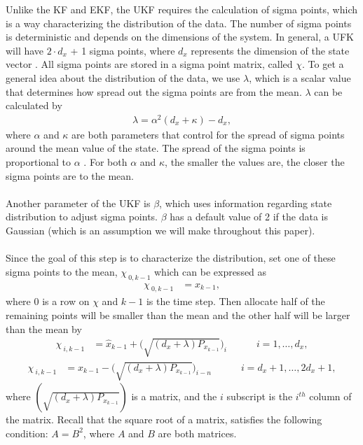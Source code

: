 \begin{enumerate}
\noindent Unlike the KF and EKF, the UKF requires the calculation of sigma points, which is a way characterizing the distribution of the data. The number of sigma points is deterministic and depends on the dimensions of the system. In general, a UFK will have  $2 \cdot d_x$ + 1 sigma points, where $d_x$ represents the dimension of the state vector \cite{inbook, inproceedings, Wan01theunscented}.  All sigma points are stored in a sigma point matrix, called $\chi$. To get a general idea about the distribution of the data, we use $\lambda$, which is a scalar value that determines how spread out the sigma points are from the mean. $\lambda$ can be calculated by
         \begin{align*}
        \lambda = \alpha^{2}(d_{x}+\kappa)-d_{x},
         \end{align*}
         where  $\alpha$ and $\kappa$ are both parameters that control for the spread of sigma points around the mean value of the state. The spread of the sigma points is proportional to $\alpha$ . For both $\alpha$ and $\kappa $,  the smaller the values are, the closer the sigma points are to the mean.\\ \\
       Another parameter of the UKF is $\beta$, which uses information regarding state distribution to adjust sigma points. $\beta$ has a default value of 2 if the data is Gaussian (which is an assumption we will make throughout this paper).  \\ \\
       Since the goal of this step is to characterize the distribution, set one of these sigma points to the mean, $\chi_{\ 0,k-1}$ which can be expressed as 
    \begin{align*}
        \chi_{\ 0,k-1} &= x_{k-1} ,
     \end{align*}
     where 0 is a row on $\chi$ and $k-1$ is the time step. Then allocate half of the remaining points will be smaller than the mean and the other half will be larger than the mean by
         \begin{align*}
        \chi_{\ i,k-1} &= \hat{x}_{k-1} +  \bigg(\sqrt{(d_{x}+\lambda )P_{x_{k-1}}}\bigg)_{i} \quad \quad \quad i=1,\dots, d_x, 
        \end{align*}
         \begin{align*}
        \chi_{\ i,k-1} &= \hat{x}_{k-1} - \bigg(\sqrt{(d_{x}+\lambda )P_{x_{k-1}}}\bigg)_{i-n} \quad \quad \quad i=d_x + 1,\dots,2 d_x + 1,
        \end{align*}
        where $(\sqrt{(d_{x}+\lambda)P_{x_{k-1}}})$ is a matrix, and the $i$ subscript is the $i^{th}$ column of the matrix. 
        Recall that the square root of a matrix, satisfies the following condition: $A = B^2$, where $A$ and $B$ are both matrices. 
        

\end{enumerate}
